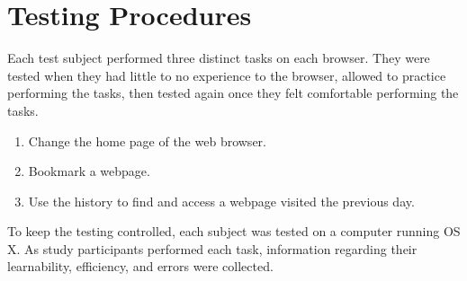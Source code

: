 \documentclass{article}
\begin{document}
\section{Testing Procedures} Each test subject performed three distinct tasks on each browser. They were tested when they had little to no experience to the browser, allowed to practice performing the tasks, then tested again once they felt comfortable performing the tasks.
\begin{enumerate}
	\item Change the home page of the web browser.
	\item Bookmark a webpage.
	\item Use the history to find and access a webpage visited the previous day.
\end{enumerate}
To keep the testing controlled, each subject was tested on a computer running OS X. As study participants performed each task, information regarding their learnability, efficiency, and errors were collected.
\end{document}
